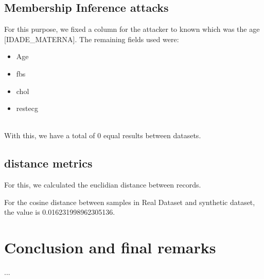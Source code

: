 \documentclass{article}
\begin{document}
\subsection{Membership Inference attacks}
For this purpose, we fixed a column for the attacker to known which was the age [IDADE\_MATERNA].
The remaining fields used were:
\begin{itemize}
 
  \item Age
     
  \item fbs
     
  \item chol
     
  \item restecg
     
  \end{itemize}
\\
With this, we have a total of 0 equal results between datasets.

\subsection{distance metrics}

For this, we calculated the euclidian distance between records.

For the cosine distance between samples in Real Dataset and synthetic dataset, the value is 0.016231998962305136.



\section{Conclusion and final remarks}

...

\cleardoublepage
\printglossary[type=\acronymtype]
\cleardoublepage


\end{document}
